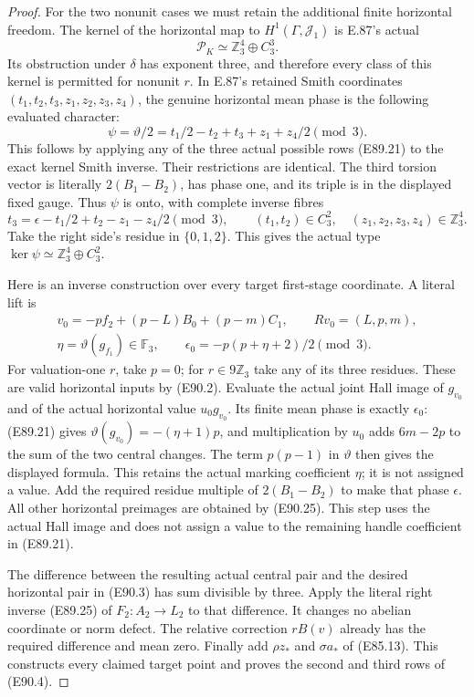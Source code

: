 \begin{proof}
For the two nonunit cases we must retain the
additional finite horizontal freedom. The
kernel of the horizontal map to $H^1(\Gamma,\mathcal J_1)$
is E.87's actual
\[
             \mathcal P_K\simeq\mathbb Z_3^4\oplus C_3^3.
 \tag{E90.23}
\]
Its obstruction under $\delta$ has exponent
three, and therefore every class of this
kernel is permitted for nonunit $r$.
In E.87's retained Smith coordinates
$(t_1,t_2,t_3,z_1,z_2,z_3,z_4)$, the genuine
horizontal mean phase is the following
evaluated character:
\[
 \psi=\vartheta/2
       =t_1/2-t_2+t_3+z_1+z_4/2\pmod3.
 \tag{E90.24}
\]
This follows by applying any of the three
actual possible rows (E89.21) to the exact
kernel Smith inverse. Their restrictions
are identical. The third torsion vector is
literally $2(B_1-B_2)$, has phase one, and
its triple is in the displayed fixed gauge.
Thus $\psi$ is onto, with complete inverse
fibres
\[
 t_3=\epsilon-t_1/2+t_2-z_1-z_4/2\pmod3,
 \qquad (t_1,t_2)\in C_3^2,\quad(z_1,z_2,z_3,z_4)\in\mathbb Z_3^4.
 \tag{E90.25}
\]
Take the right side's residue in $\{0,1,2\}$.
This gives the actual type
$\ker\psi\simeq\mathbb Z_3^4\oplus C_3^2$.

Here is an inverse construction over every
target first-stage coordinate. A literal lift is
\[
 \begin{gathered}
       v_0=-p f_2+(p-L)B_0+(p-m)C_1,
                  \qquad Rv_0=(L,p,m),\\
       \eta=\vartheta(g_{f_1})\in\mathbb F_3,
       \qquad \epsilon_0=-p(p+\eta+2)/2\pmod3.
 \end{gathered}
 \tag{E90.26}
\]
For valuation-one $r$, take $p=0$; for $r\in9\mathbb Z_3$
take any of its three residues. These are valid
horizontal inputs by (E90.2). Evaluate the
actual joint Hall image of $g_{v_0}$ and of
the actual horizontal value $u_0g_{v_0}$.
Its finite mean phase is exactly $\epsilon_0$:
(E89.21) gives $\vartheta(g_{v_0})=-(\eta+1)p$,
and multiplication by $u_0$ adds $6m-2p$
to the sum of the two central changes.
The term $p(p-1)$ in $\vartheta$ then gives
the displayed formula. This retains the
actual marking coefficient $\eta$; it is
not assigned a value. Add the required residue multiple of
$2(B_1-B_2)$ to make that phase $\epsilon$.
All other horizontal preimages are obtained
by (E90.25). This step uses the actual Hall
image and does not assign a value to the
remaining handle coefficient in (E89.21).

The difference between the resulting actual
central pair and the desired horizontal pair
in (E90.3) has sum divisible by three.
Apply the literal right inverse (E89.25) of
$F_2:A_2\to L_2$ to that difference. It changes
no abelian coordinate or norm defect. The
relative correction $rB(v)$ already has
the required difference and mean zero.
Finally add $\rho z_*$ and $\sigma a_*$ of
(E85.13). This constructs every claimed
target point and proves the second and
third rows of (E90.4).


\end{proof}

